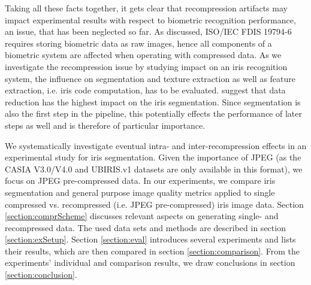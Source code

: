 \documentclass[10pt,twocolumn,letterpaper]{article}
\begin{document}
	Taking all these facts together, it gets clear that recompression artifacts may impact experimental results with respect to biometric recognition
	performance, an issue, that has been neglected so far. As discussed, ISO/IEC FDIS 19794-6 requires storing biometric data as raw images, hence all components of a biometric system are affected when operating with compressed data. As we investigate the recompression issue by studying impact on an iris recognition system, the influence on segmentation and texture extraction as well as feature extraction, i.e. iris code computation, has to be evaluated. \cite{severeCompression, BDaugman08a} suggest that data reduction has the highest impact on the iris segmentation. Since segmentation is also the first step in the pipeline, this potentially effects the performance of later steps as well and is therefore of particular importance. 
	
We systematically investigate eventual intra- and inter-recompression effects in an experimental study for iris segmentation. Given the importance of JPEG (as the CASIA V3.0/V4.0 and UBIRIS.v1 datasets are only available in this format), we focus on JPEG pre-compressed data. In our experiments, we compare iris segmentation and general purpose image quality metrics applied	to single compressed vs. recompressed (i.e. JPEG pre-compressed) iris image data. Section \ref{section:comprScheme} discusses relevant aspects on generating single- and recompressed data. The used data sets and methods are described in section \ref{section:exSetup}. Section \ref{section:eval} introduces several experiments and lists their results, which are then compared in section \ref{section:comparison}. From the experiments' individual and comparison results, we draw conclusions in section \ref{section:conclusion}.
	
\end{document}
